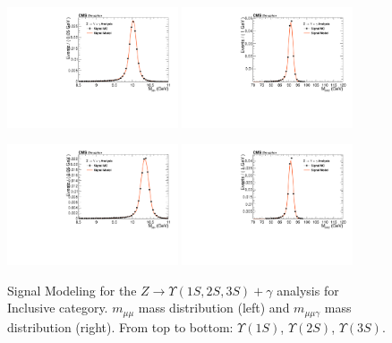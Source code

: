 \begin{figure}[!htbp]
\begin{center}
\includegraphics[width=0.45\textwidth]{figures_and_tables/fitPlotFiles2D/ZToUpsilonPhotonSignalAndBackgroundFit/mMuMNU_ZToUpsilon2SPhotonSignalAndBackgroundFit_Signal_Cat0}\hspace*{1.cm}
\includegraphics[width=0.45\textwidth]{figures_and_tables/fitPlotFiles2D/ZToUpsilonPhotonSignalAndBackgroundFit/mHZ_ZToUpsilon2SPhotonSignalAndBackgroundFit_Signal_Cat0_default}\hspace*{1.cm}

\includegraphics[width=0.45\textwidth]{figures_and_tables/fitPlotFiles2D/ZToUpsilonPhotonSignalAndBackgroundFit/mMuMNU_ZToUpsilon3SPhotonSignalAndBackgroundFit_Signal_Cat0}\hspace*{1.cm}
\includegraphics[width=0.45\textwidth]{figures_and_tables/fitPlotFiles2D/ZToUpsilonPhotonSignalAndBackgroundFit/mHZ_ZToUpsilon3SPhotonSignalAndBackgroundFit_Signal_Cat0_default}\hspace*{1.cm}


\end{center}\vspace*{-.5cm}
\caption{Signal Modeling for the $Z \rightarrow \Upsilon(1S,2S,3S) +\gamma$ analysis for Inclusive category. $m_{\mu\mu}$ mass distribution (left) and $m_{\mu\mu\gamma}$ mass distribution (right). From top to bottom: $\Upsilon(1S)$, $\Upsilon(2S)$, $\Upsilon(3S)$.}
\label{fig:ZToUpsilon_Signal_Cat0}
\end{figure}

